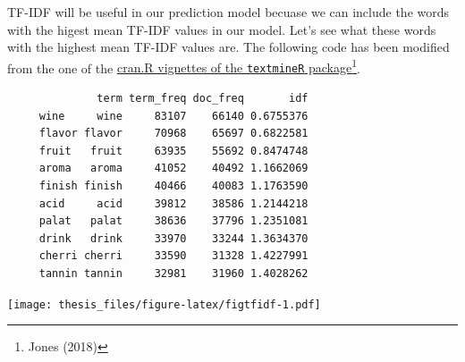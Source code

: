 \documentclass[12pt,twoside]{amherstthesis}
\newenvironment{Shaded}{\begin{snugshade}}{\end{snugshade}}
\newcommand{\KeywordTok}[1]{\textcolor[rgb]{0.13,0.29,0.53}{\textbf{#1}}}
\newcommand{\DataTypeTok}[1]{\textcolor[rgb]{0.13,0.29,0.53}{#1}}
\newcommand{\DecValTok}[1]{\textcolor[rgb]{0.00,0.00,0.81}{#1}}
\newcommand{\StringTok}[1]{\textcolor[rgb]{0.31,0.60,0.02}{#1}}
\newcommand{\CommentTok}[1]{\textcolor[rgb]{0.56,0.35,0.01}{\textit{#1}}}
\newcommand{\OtherTok}[1]{\textcolor[rgb]{0.56,0.35,0.01}{#1}}
\newcommand{\OperatorTok}[1]{\textcolor[rgb]{0.81,0.36,0.00}{\textbf{#1}}}
\newcommand{\NormalTok}[1]{#1}
\begin{document}
TF-IDF will be useful in our prediction model becuase we can include the
words with the higest mean TF-IDF values in our model. Let's see what
these words with the highest mean TF-IDF values are. The following code
has been modified from the one of the
\href{https://cran.r-project.org/web/packages/textmineR/vignettes/a_start_here.html}{cran.R
vignettes of the \texttt{textmineR} package}\footnote{Jones (2018)}.
\begin{Shaded}
\end{Shaded}
\begin{verbatim}
              term term_freq doc_freq       idf
     wine     wine     83107    66140 0.6755376
     flavor flavor     70968    65697 0.6822581
     fruit   fruit     63935    55692 0.8474748
     aroma   aroma     41052    40492 1.1662069
     finish finish     40466    40083 1.1763590
     acid     acid     39812    38586 1.2144218
     palat   palat     38636    37796 1.2351081
     drink   drink     33970    33244 1.3634370
     cherri cherri     33590    31328 1.4227991
     tannin tannin     32981    31960 1.4028262
\end{verbatim}
\begin{Shaded}
\end{Shaded}
\texttt{[image: thesis\_files/figure-latex/figtfidf-1.pdf]}
\end{document}
